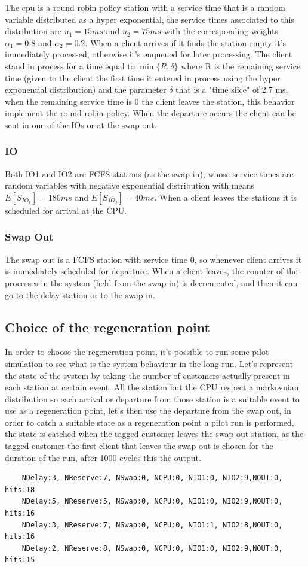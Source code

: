 \documentclass[12pt,a4paper]{article}
\begin{document}
The cpu is a round robin policy station with a service time that is a random variable distributed as a hyper exponential, the service times associated to this distribution are $u_1=15ms$ and $u_2=75ms$ with the corresponding weights $\alpha_1=0.8$ and $\alpha_2=0.2$. When a client arrives if it finds the station empty it's immediately processed, otherwise it's enqueued for later processing. The client stand in process for a time equal to $\min\{R,\delta\}$ where R is the remaining service time (given to the client the first time it entered in process using the hyper exponential distribution) and the parameter $\delta$ that is a "time slice" of 2.7 ms, when the remaining service time is 0 the client leaves the station, this behavior implement the round robin policy. When the departure occurs the client can be sent in one of the IOs or at the swap out. 

\subsubsection{IO}

Both IO1 and IO2 are FCFS stations (as the swap in), whose service times are random variables with negative exponential distribution with means $E[S_{IO_1}] = 180ms$ and $E[S_{IO_2}]= 40ms$. When a client leaves the stations it is scheduled for arrival at the CPU.

\subsubsection{Swap Out}
The swap out is a FCFS station with service time 0, so whenever client arrives it is immediately scheduled for departure. When a client leaves, the counter of the processes in the system (held from the swap in) is decremented, and then it can go to the delay station or to the swap in.


\subsection{Choice of the regeneration point}
In order to choose the regeneration point, it's possible to run some pilot simulation to see what is the system behaviour in the long run. Let's represent the state of the system by taking the number of customers actually present in each station at certain event. All the station but the CPU respect a markovnian distribution so each arrival or departure from those station is a suitable event to use as a regeneration point, let's then use the departure from the swap out, in order to catch a suitable state as a regeneration point a pilot run is performed, the state is catched when the tagged customer leaves the swap out station, as the tagged customer the first client that leaves the swap out is chosen for the duration of the run, after 1000 cycles this the output.
\begin{verbatim}
    NDelay:3, NReserve:7, NSwap:0, NCPU:0, NIO1:0, NIO2:9,NOUT:0, hits:18
    NDelay:5, NReserve:5, NSwap:0, NCPU:0, NIO1:0, NIO2:9,NOUT:0, hits:16
    NDelay:3, NReserve:7, NSwap:0, NCPU:0, NIO1:1, NIO2:8,NOUT:0, hits:16
    NDelay:2, NReserve:8, NSwap:0, NCPU:0, NIO1:0, NIO2:9,NOUT:0, hits:15
\end{verbatim}
\end{document}
